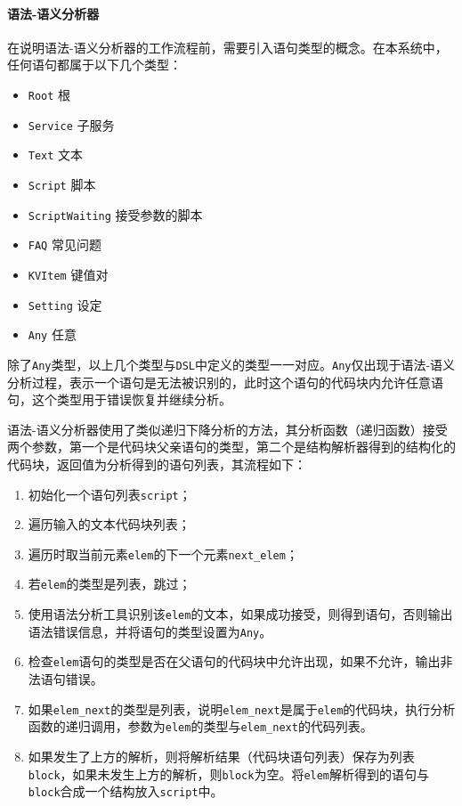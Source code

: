 \documentclass[hyperref]{ctexart}
\begin{document}
\paragraph{语法-语义分析器}
在说明语法-语义分析器的工作流程前，需要引入语句类型的概念。在本系统中，任何语句都属于以下几个类型：
\begin{itemize}
    \item \texttt{Root} 根
    \item \texttt{Service} 子服务
    \item \texttt{Text} 文本
    \item \texttt{Script} 脚本
    \item \texttt{ScriptWaiting} 接受参数的脚本
    \item \texttt{FAQ} 常见问题
    \item \texttt{KVItem} 键值对
    \item \texttt{Setting} 设定
    \item \texttt{Any} 任意
\end{itemize}
除了\texttt{Any}类型，以上几个类型与\texttt{DSL}中定义的类型一一对应。\texttt{Any}仅出现于语法-语义分析过程，表示一个语句是无法被识别的，此时这个语句的代码块内允许任意语句，这个类型用于错误恢复并继续分析。
\par 语法-语义分析器使用了类似递归下降分析的方法，其分析函数（递归函数）接受两个参数，第一个是代码块父亲语句的类型，第二个是结构解析器得到的结构化的代码块，返回值为分析得到的语句列表，其流程如下：
\begin{enumerate}
    \item 初始化一个语句列表\texttt{script}；
    \item 遍历输入的文本代码块列表；
    \item 遍历时取当前元素\texttt{elem}的下一个元素\texttt{next\_elem}；
    \item 若\texttt{elem}的类型是列表，跳过；
    \item 使用语法分析工具识别该\texttt{elem}的文本，如果成功接受，则得到语句，否则输出语法错误信息，并将语句的类型设置为\texttt{Any}。
    \item 检查\texttt{elem}语句的类型是否在父语句的代码块中允许出现，如果不允许，输出非法语句错误。
    \item 如果\texttt{elem\_next}的类型是列表，说明\texttt{elem\_next}是属于\texttt{elem}的代码块，执行分析函数的递归调用，参数为\texttt{elem}的类型与\texttt{elem\_next}的代码列表。
    \item 如果发生了上方的解析，则将解析结果（代码块语句列表）保存为列表\texttt{block}，如果未发生上方的解析，则\texttt{block}为空。将\texttt{elem}解析得到的语句与\texttt{block}合成一个结构放入\texttt{script}中。
\end{enumerate}
\end{document}
